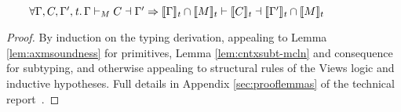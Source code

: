 \begin{lemma}
  \label{lemma:embedw}
\\\mbox{$\qquad
\forall\Gamma,C,\Gamma',\mathit{t}\ldotp\Gamma\vdash_M C\dashv \Gamma' \Rightarrow
\llbracket\Gamma\rrbracket_\mathit{t}\cap\llbracket{M}\rrbracket_t\vdash \llbracket C\rrbracket_\mathit{t}\dashv\llbracket\Gamma'\rrbracket_\mathit{t}\cap\llbracket{M}\rrbracket_t
$}
\end{lemma}
\begin{proof}
By induction on the typing derivation, appealing to Lemma \ref{lem:axmsoundness} for primitives, Lemma \ref{lem:cntxsubt-mcln} and consequence for subtyping, and otherwise appealing to structural rules of the Views logic and inductive hypotheses.
Full details in Appendix \ref{sec:prooflemmas} of the technical report~\cite{isotek}. %
  \end{proof}

